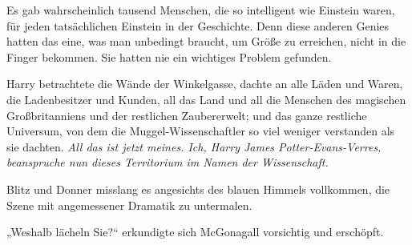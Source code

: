 Es gab wahrscheinlich tausend Menschen, die so intelligent wie Einstein waren, für jeden tatsächlichen Einstein in der Geschichte. Denn diese anderen Genies hatten das eine, was man unbedingt braucht, um Größe zu erreichen, nicht in die Finger bekommen. Sie hatten nie ein wichtiges Problem gefunden.

Harry betrachtete die Wände der Winkelgasse, dachte an alle Läden und Waren, die Ladenbesitzer und Kunden, all das Land und all die Menschen des magischen Großbritanniens und der restlichen Zaubererwelt; und das ganze restliche Universum, von dem die Muggel-Wissenschaftler so viel weniger verstanden als sie dachten. \emph{All das ist jetzt meines. Ich, Harry James Potter-Evans-Verres, beanspruche nun dieses Territorium im Namen der Wissenschaft.}

Blitz und Donner misslang es angesichts des blauen Himmels vollkommen, die Szene mit angemessener Dramatik zu untermalen.

„Weshalb lächeln Sie?“ erkundigte sich McGonagall vorsichtig und erschöpft.

